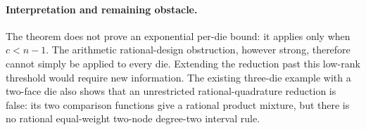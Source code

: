 \documentclass[11pt]{article}
\begin{document}
\paragraph{Interpretation and remaining obstacle.}
The theorem does not prove an exponential per-die bound: it applies only
when $c<n-1$. The arithmetic rational-design obstruction, however strong,
therefore cannot simply be applied to every die. Extending the reduction
past this low-rank threshold would require new information. The existing
three-die example with a two-face die also shows that an unrestricted
rational-quadrature reduction is false: its two comparison functions give
a rational product mixture, but there is no rational equal-weight two-node
degree-two interval rule.
\end{document}

